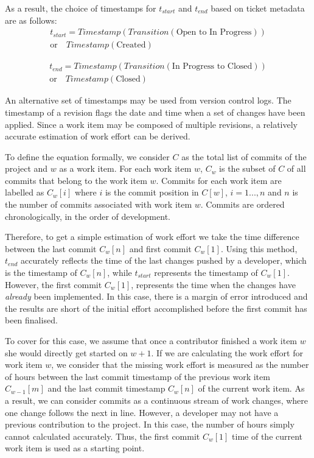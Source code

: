 \documentclass{mpaper}
\begin{document}
As a result, the choice of timestamps for $t_{start}$ and $t_{end}$ based on
ticket metadata are as follows:
\begin{equation}
  \label{eq-ticket-start}
  \begin{aligned}
    t_{start} = Timestamp(Transition(\textrm{Open to In Progress})) \\ 
      \textrm{or} \quad Timestamp(\textrm{Created})
  \end{aligned}
\end{equation}

\begin{equation}
  \label{eq-ticket-closed}
  \begin{aligned}
    t_{end} = Timestamp(Transition(\textrm{In Progress to Closed})) \\ 
      \textrm{or} \quad Timestamp(\textrm{Closed})    
  \end{aligned}
\end{equation}

An alternative set of timestamps may be used from version control logs. The
timestamp of a revision flags the date and time when a set of changes have been
applied. Since a work item may be composed of multiple revisions, a relatively
accurate estimation of work effort can be derived. 

To define the equation formally, we consider $C$ as the total list of commits of
the project and $w$ as a work item. For each work item $w$, $C_{w}$ is the
subset of $C$ of all commits that belong to the work item $w$. Commits for each
work item are labelled as $C_{w}[i]$ where $i$ is the commit position in $C[w]$,
$i=1...,n$ and $n$ is the number of commits associated with work item $w$.
Commits are ordered chronologically, in the order of development.

Therefore, to get a simple estimation of work effort we take the time difference
between the last commit $C_{w}[n]$ and first commit $C_{w}[1]$. Using this
method, $t_{end}$ accurately reflects the time of the last changes pushed by a
developer, which is the timestamp of $C_{w}[n]$, while $t_{start}$ represents
the timestamp of $C_{w}[1]$. However, the first commit $C_{w}[1]$, represents
the time when the changes have \emph{already} been implemented. In this case,
there is a margin of error introduced and the results are short of the
initial effort accomplished before the first commit has been finalised.

To cover for this case, we assume that once a contributor finished a work item
$w$ she would directly get started on $w+1$. If we are calculating the work
effort for work item $w$, we consider that the missing work effort is measured
as the number of hours between the last commit timestamp of the previous work
item $C_{w-1}[m]$ and the last commit timestamp $C_{w}[n]$ of the current work
item. As a result, we can consider commits as a continuous stream of work
changes, where one change follows the next in line. However, a developer may not
have a previous contribution to the project. In this case, the number of hours
simply cannot calculated accurately. Thus, the first commit $C_{w}[1]$ time of
the current work item is used as a starting point.
\end{document}
